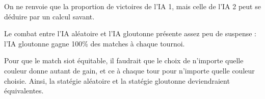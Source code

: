 \documentclass[a4paper,11pt]{article}
\begin{document}
	On ne renvoie que la proportion de victoires de l'IA 1, mais celle de l'IA 2 peut se d\'eduire par un calcul savant.
	
	Le combat entre l'IA al\'eatoire et l'IA gloutonne pr\'esente assez peu de suspense : l'IA gloutonne gagne 100\% des matches \`a chaque tournoi.
	
	Pour que le match siot \'equitable, il faudrait que le choix de n'importe quelle couleur donne autant de gain, et ce \`a chaque tour pour n'importe quelle couleur choisie. Ainsi, la stat\'egie al\'eatoire et la stat\'egie gloutonne deviendraient \'equivalentes.
	
	
	
	
	
	
\end{document}
